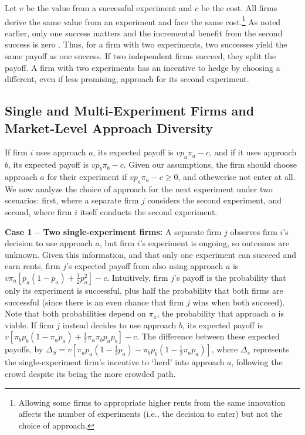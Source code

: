 Let $v$ be the value from a successful experiment and $c$ be the cost. All firms derive the same value from an experiment and face the same cost.\footnote{Allowing some firms to appropriate higher rents from the same innovation \citep{cohen1996firm} affects the number of experiments (i.e., the decision to enter) but not the choice of approach.} As noted earlier, only one success matters and the incremental benefit from the second success is zero \citep{dasgupta1987simple}. Thus, for a firm with two experiments, two successes yield the same payoff as one success. If two independent firms succeed, they split the payoff. A firm with two experiments has an incentive to hedge by choosing a different, even if less promising, approach for its second experiment. 

\subsection{Single and Multi-Experiment Firms and Market-Level Approach Diversity}


If firm $i$ uses approach $a$, its expected payoff is $vp_a\pi_a - c$, and if it uses approach $b$, its expected payoff is $vp_b\pi_b - c$. Given our assumptions, the firm should choose approach $a$ for their experiment if $vp_a\pi_a - c \geq 0$, and othewerise not enter at all. We now analyze the choice of approach for the next experiment under two scenarios: first, where a separate firm $j$ considers the second experiment, and second, where firm $i$ itself conducts the second experiment.

\noindent \textbf{Case 1 -- Two single-experiment firms:} A separate firm $j$ observes firm $i$'s decision to use approach $a$, but firm $i$'s experiment is ongoing, so outcomes are unknown. Given this information, and that only one experiment can succeed and earn rents, firm $j$'s expected payoff from also using approach $a$ is ${v\pi_a}\left[p_a(1-p_a) + \frac{1}{2}p_a^2\right] - c$. Intuitively, firm $j$'s payoff is the probability that only its experiment is successful, plus half the probability that both firms are successful (since there is an even chance that firm $j$ wins when both succeed). Note that both probabilities depend on $\pi_a$, the probability that approach $a$ is viable. If firm $j$ instead decides to use approach $b$, its expected payoff is $v\left[\pi_b{p_b}(1 - \pi_a{p_a}) + \frac{1}{2}\pi_a\pi_bp_ap_b\right] - c$. The difference between these expected payoffs, by $\Delta_S = v\left[\pi_ap_a\left(1-\frac{1}{2}p_a\right) - \pi_bp_b\left(1 - \frac{1}{2}\pi_ap_a\right)\right]$, where $\Delta_s$ represents the single-experiment firm's incentive to `herd' into approach $a$, following the crowd despite its being the more crowded path.

